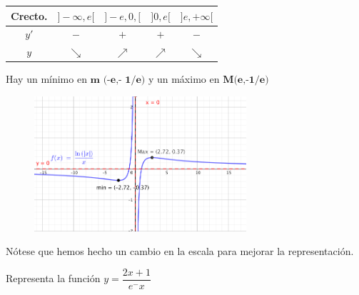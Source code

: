 \begin{proofw}
	\begin{table}[H]
	\centering
	\begin{tabular}{|c|c|c|c|c|}
	\hline
	Crecto. & $]-\infty ,e[$ & $]-e,0,[$ & $]0,e[$  & $]e,+\infty[$ \\ \hline
 	$y'$ & $-$  & $+$ & $+$ & $-$ \\ \hline
 	$y$& $\searrow$ & $\nearrow$  & $\nearrow$ & $\searrow$ \\ \hline
	\end{tabular}
	\end{table}
		
	Hay un mínimo en $\textbf{m (-e,- 1/e)}$ y un máximo en $\textbf{M(e,-1/e)}$


	\begin{figure}[H]
		\centering
		\includegraphics[width=0.7\textwidth]{imagenes/imagenes05/T05IM37.png}
	\end{figure}
	
	Nótese que hemos hecho un cambio en la escala para mejorar la representación.

\end{proofw}


\begin{ejre} Representa la función $y=\dfrac {2x+1}{e^-x}$
	
\end{ejre}

